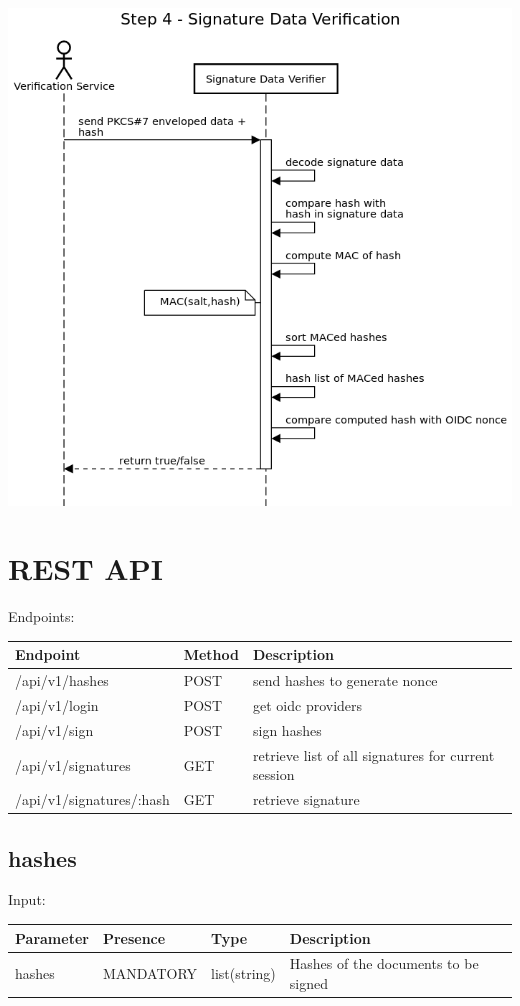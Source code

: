 \includegraphics[scale=0.5]{images/protocol_verification_step4_signature_data.png}

\section{REST API}
Endpoints:

\begin{tabular}{|l|l|l|}
	\hline
	Endpoint & Method & Description \\ \hline
	/api/v1/hashes & POST & send hashes to generate nonce \\ \hline
	/api/v1/login & POST & get oidc providers \\ \hline
	/api/v1/sign & POST & sign hashes \\ \hline
	/api/v1/signatures & GET & retrieve list of all signatures for current session \\ \hline
	/api/v1/signatures/:hash & GET & retrieve signature \\ \hline
\end{tabular}

\subsection{hashes}
Input:

\begin{tabular}{|l|l|l|l|}
	\hline
	Parameter & Presence & Type & Description \\ \hline
	hashes & MANDATORY & list(string) & Hashes of the documents to be signed \\ \hline
\end{tabular}

